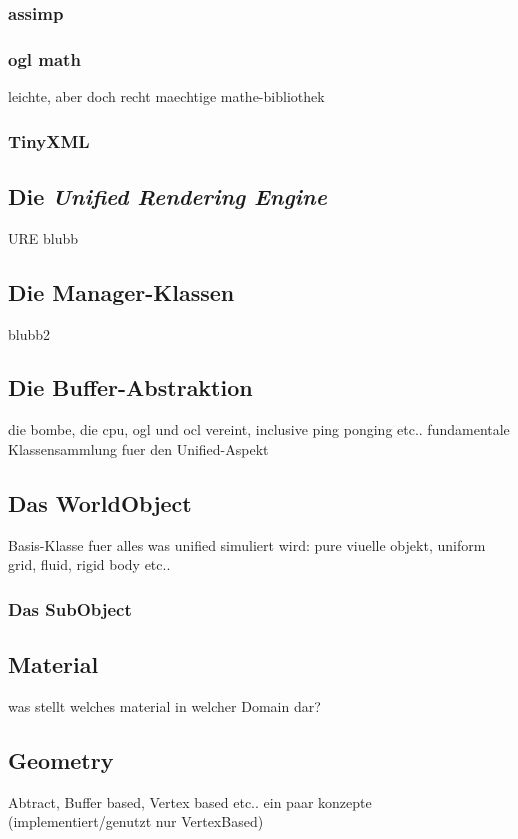     \subsubsection{assimp}
    \subsubsection{ogl math}
    	leichte, aber doch recht maechtige mathe-bibliothek
    \subsubsection{TinyXML}
    	
    	
\subsection{Die \emph{Unified Rendering Engine}}
URE blubb

\subsection{Die Manager-Klassen}
blubb2
    	
\subsection{Die Buffer-Abstraktion}   	
 	die bombe, die cpu, ogl und ocl vereint, inclusive ping ponging etc.. fundamentale Klassensammlung fuer den Unified-Aspekt
 
\subsection{Das WorldObject}
	Basis-Klasse fuer alles was unified simuliert wird: pure viuelle objekt, uniform grid, fluid, rigid body etc..
	
	\subsubsection{Das SubObject}
  
 
\subsection{Material}  
	was stellt welches material in welcher Domain dar?
	
\subsection{Geometry}
	Abtract, Buffer based, Vertex based etc.. ein paar konzepte (implementiert/genutzt nur VertexBased)  
	

